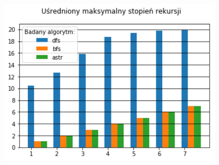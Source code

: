 \documentclass{classrep}
\begin{document}
\begin{figure}[H]
  \centering
    \begin{minipage}{0.45\textwidth}
        \centering
        \includegraphics[width=1.1\textwidth]{output_3_3.png} %
    \end{minipage}
\end{figure}

\end{document}

